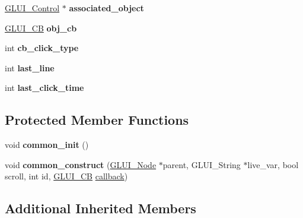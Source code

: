 \begin{DoxyCompactItemize}
\item 
\hypertarget{class_g_l_u_i___list_a1c3da23655fb3019ecf7836782c6a0c6}{\hyperlink{class_g_l_u_i___control}{G\+L\+U\+I\+\_\+\+Control} $\ast$ {\bfseries associated\+\_\+object}}\label{class_g_l_u_i___list_a1c3da23655fb3019ecf7836782c6a0c6}

\item 
\hypertarget{class_g_l_u_i___list_ada809121f5b61c3ec100ef2b2cc87a3e}{\hyperlink{class_g_l_u_i___c_b}{G\+L\+U\+I\+\_\+\+C\+B} {\bfseries obj\+\_\+cb}}\label{class_g_l_u_i___list_ada809121f5b61c3ec100ef2b2cc87a3e}

\item 
\hypertarget{class_g_l_u_i___list_a10035be2d469c11e4009e77540bdf080}{int {\bfseries cb\+\_\+click\+\_\+type}}\label{class_g_l_u_i___list_a10035be2d469c11e4009e77540bdf080}

\item 
\hypertarget{class_g_l_u_i___list_a500f3a7a615367a44088d69c8e537ba6}{int {\bfseries last\+\_\+line}}\label{class_g_l_u_i___list_a500f3a7a615367a44088d69c8e537ba6}

\item 
\hypertarget{class_g_l_u_i___list_af90d2646dbb12f1dbe1bfd9e8891fc37}{int {\bfseries last\+\_\+click\+\_\+time}}\label{class_g_l_u_i___list_af90d2646dbb12f1dbe1bfd9e8891fc37}

\end{DoxyCompactItemize}
\subsection*{Protected Member Functions}
\begin{DoxyCompactItemize}
\item 
\hypertarget{class_g_l_u_i___list_a2693fbb3bd3dd6bb051ca1f02d4a017c}{void {\bfseries common\+\_\+init} ()}\label{class_g_l_u_i___list_a2693fbb3bd3dd6bb051ca1f02d4a017c}

\item 
\hypertarget{class_g_l_u_i___list_abe3d92ffe3c2795adb4b0b2bec3a390a}{void {\bfseries common\+\_\+construct} (\hyperlink{class_g_l_u_i___node}{G\+L\+U\+I\+\_\+\+Node} $\ast$parent, G\+L\+U\+I\+\_\+\+String $\ast$live\+\_\+var, bool scroll, int id, \hyperlink{class_g_l_u_i___c_b}{G\+L\+U\+I\+\_\+\+C\+B} \hyperlink{class_g_l_u_i___control_a96060fe0cc6d537e736dd6eef78e24ab}{callback})}\label{class_g_l_u_i___list_abe3d92ffe3c2795adb4b0b2bec3a390a}

\end{DoxyCompactItemize}
\subsection*{Additional Inherited Members}


